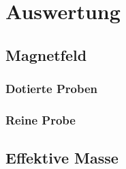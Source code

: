 \section{Auswertung}
\label{sec:auswertung}

\cite{matplotlib} \cite{numpy}

\subsection{Magnetfeld}


\subsubsection{Dotierte Proben}

\subsubsection{Reine Probe}

\subsection{Effektive Masse}
